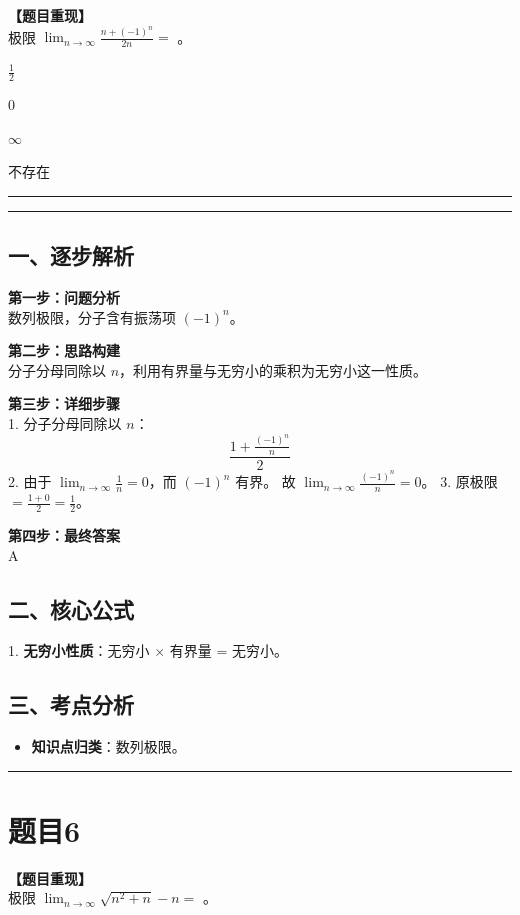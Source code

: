 \documentclass[12pt, a4paper]{ctexart}
\newcommand{\TopSeparator}{
    \par\noindent\rule{\textwidth}{1.5pt}\vspace{0.5em} %
}
\newcommand{\AnalysisSeparator}{
    \par\noindent\rule{\textwidth}{0.5pt}\vspace{0.2em}\hrule\vspace{0.5em} %
}
\newenvironment{RedAnalysis}{
    \par
    \color{red} %
}{
    \par
    \color{black} %
}
\newcommand{\choicesFour}[4]{
    \begin{enumerate}[label=\Alph*., itemsep=0pt, parsep=0pt, topsep=5pt, labelsep=0.5em]
        \begin{minipage}{0.22\linewidth} \item #1 \end{minipage}
        \begin{minipage}{0.22\linewidth} \item #2 \end{minipage}
        \begin{minipage}{0.22\linewidth} \item #3 \end{minipage}
        \begin{minipage}{0.22\linewidth} \item #4 \end{minipage}
    \end{enumerate}
}
\begin{document}
\textbf{【题目重现】} \\
极限 $ \lim_{n\to\infty}\frac{n+(-1)^{n}}{2n}= $ \underline{\hspace{1cm}}。
\choicesFour{$ \frac{1}{2} $}{0}{$ \infty $}{不存在}

\AnalysisSeparator

\begin{RedAnalysis}

\subsection*{一、逐步解析}

\textbf{第一步：问题分析} \\
数列极限，分子含有振荡项 $(-1)^n$。

\textbf{第二步：思路构建} \\
分子分母同除以 $n$，利用有界量与无穷小的乘积为无穷小这一性质。

\textbf{第三步：详细步骤} \\
1. 分子分母同除以 $n$：
   \[ \frac{1 + \frac{(-1)^n}{n}}{2} \]
2. 由于 $\lim_{n\to\infty} \frac{1}{n} = 0$，而 $(-1)^n$ 有界。
   故 $\lim_{n\to\infty} \frac{(-1)^n}{n} = 0$。
3. 原极限 $= \frac{1+0}{2} = \frac{1}{2}$。

\textbf{第四步：最终答案} \\
A

\subsection*{二、核心公式}
1. \textbf{无穷小性质}：无穷小 $\times$ 有界量 = 无穷小。

\subsection*{三、考点分析}
\begin{itemize}
    \item \textbf{知识点归类}：数列极限。
\end{itemize}

\end{RedAnalysis}

\vspace{2em}

\TopSeparator
\section*{题目6}

\textbf{【题目重现】} \\
极限 $ \lim_{n\to\infty}\sqrt{n^{2}+n}-n= $ \underline{\hspace{2cm}}。
\end{document}
